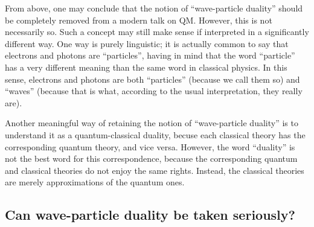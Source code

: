 \documentclass[12pt]{article}
\begin{document}
From above, one may conclude that the notion of ``wave-particle duality''
should be completely removed from a modern talk on QM. 
However, this is not necessarily so. Such a concept may still 
make sense if interpreted in a significantly different way. 
One way is purely linguistic; it is actually common to say that 
electrons and photons are ``particles'', having in mind that 
the word ``particle'' has a very different meaning than the same 
word in classical physics. In this sense, electrons and photons 
are both ``particles'' (because we call them so) and ``waves''
(because that is what, according to the usual interpretation, 
they really are). 

Another meaningful way of retaining the notion of 
``wave-particle duality'' is to understand it as a
quantum-classical duality, becuse each classical theory
has the corresponding quantum theory, and vice versa. 
However, the word ``duality'' is not the best word for this 
correspondence, because the corresponding quantum and classical theories 
do not enjoy the same rights. Instead, the classical theories 
are merely approximations of the quantum ones.  
 
\subsection{Can wave-particle duality be taken seriously?}
\end{document}

